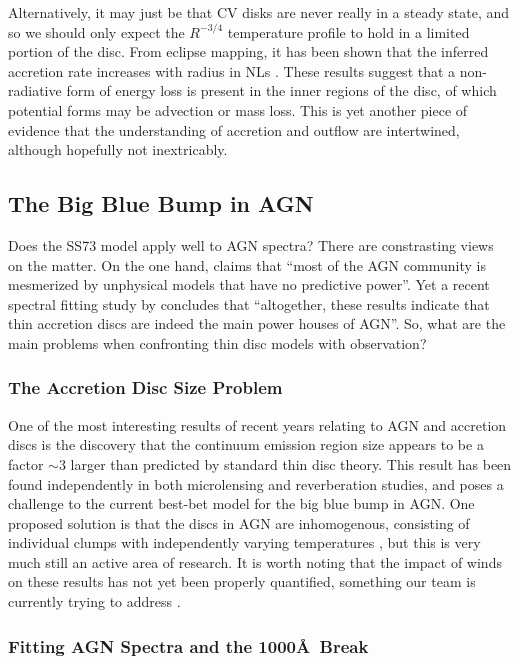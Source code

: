 Alternatively, it may just be that CV disks are never really in
a steady state, and so we should only expect the $R^{-3/4}$
temperature profile to hold in a limited portion of the disc.
From eclipse mapping, it has been shown that the inferred accretion
rate increases with radius in NLs \citep{rutten1992, horne1993}.
These results suggest that a non-radiative form of energy loss
is present in the inner regions of the disc, of which potential forms
may be advection or mass loss. This is yet another piece of evidence
that the understanding of accretion and outflow 
are intertwined, although hopefully not inextricably.

\subsection{The Big Blue Bump in AGN}

Does the SS73 model apply well to AGN spectra? There are constrasting views on the matter.
On the one hand, \cite{antonucci2013} claims that ``most of the AGN community is mesmerized by unphysical models that have no predictive power''. 
Yet a recent spectral fitting study by \cite{capellupo2015} concludes that 
``altogether, these results indicate that thin accretion discs are indeed the 
main power houses of AGN''. So, what are the main problems when 
confronting thin disc models with observation? 

\subsubsection{The Accretion Disc Size Problem}

One of the most interesting results of recent years relating to AGN and accretion discs is
the discovery that the continuum emission region size appears to be
a factor $\sim3$ larger than predicted by standard thin disc theory. This result
has been found independently in both microlensing \citep{morgan2010,dai2010} 
and reverberation \citep{edelson2015} studies, and poses a challenge to the 
current best-bet model for the big blue bump in AGN. 
One proposed solution is that the discs in AGN are inhomogenous,
consisting of individual clumps with independently
varying temperatures \citep{dexteragol2011}, but this is very much
still an active area of research. It is worth noting that the impact
of winds on these results has not yet been properly quantified, something
our team is currently trying to address \citep{mangham}.

\subsubsection{Fitting AGN Spectra and the 1000\AA\ Break}

